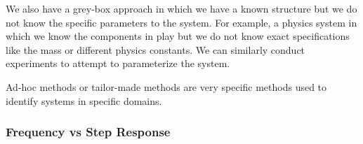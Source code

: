\documentclass[11pt]{article}
\begin{document}
We also have a grey-box approach in which we have a known structure but we do not know the specific parameters to the system.
For example, a physics system in which we know the components in play but we do not know exact specifications like the mass or different physics constants.
We can similarly conduct experiments to attempt to parameterize the system.

Ad-hoc methods or tailor-made methods are very specific methods used to identify systems in specific domains.

\subsubsection{Frequency vs Step Response}




\end{document}
